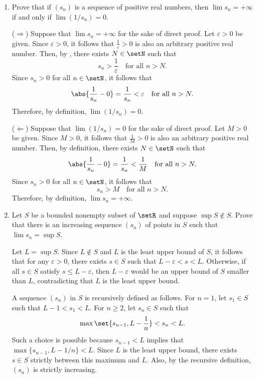 \begin{enumerate}
  \newpage

  \item Prove that if \((s_n)\) is a sequence of positive real numbers, 
  then \(\lim s_n = +\infty\) if and only if \(\lim (1 / s_n) = 0\).
  \begin{subprove}
    (\(\Rightarrow\)) Suppose that \(\lim s_n = +\infty\) for the sake of direct proof.
    Let \(\varepsilon > 0\) be given. Since \(\varepsilon > 0\), it follows that \(\frac{1}{\varepsilon} > 0\) 
    is also an arbitrary positive real number.
    Then, by ,
    there exists \(N \in \setN\) such that
    \[
      s_n > \frac{1}{\varepsilon} \quad\text{for all } n > N.
    \]
    Since \(s_n > 0\) for all \(n \in \setN\), it follows that
    \[
      \abs{\frac{1}{s_n} - 0} = \frac{1}{s_n} < \varepsilon \quad\text{for all } n > N.
    \]
    Therefore, by definition, \(\lim (1 / s_n) = 0\).

    (\(\Leftarrow\)) Suppose that \(\lim (1 / s_n) = 0\) for the sake of direct proof.
    Let \(M > 0\) be given. Since \(M > 0\), it follows that \(\frac{1}{M} > 0\) 
    is also an arbitrary positive real number.
    Then, by definition,
    there exists \(N \in \setN\) such that
    \[
      \abs{\frac{1}{s_n} - 0} = \frac{1}{s_n} < \frac{1}{M} \quad\text{for all } n > N.
    \]
    Since \(s_n > 0\) for all \(n \in \setN\), it follows that
    \[
      s_n > M \quad\text{for all } n > N.
    \]
    Therefore, by definition, \(\lim s_n = +\infty\).
  \end{subprove}



  \item Let \(S\) be a bounded nonempty subset of \(\setR\) and 
  suppose \(\sup S \notin S\). Prove that there is an increasing 
  sequence \((s_n)\) of points in \(S\) such that \(\lim s_n = \sup S\).
  \begin{subprove}
    Let \(L = \sup S\). Since \(L \notin S\) and \(L\) is the least upper bound of \(S\),
    it follows that for any \(\varepsilon > 0\), there exists \(s \in S\) such that \(L - \varepsilon < s < L\).
    Otherwise, if all \(s \in S\) satisfy \(s \leq L - \varepsilon\), then \(L - \varepsilon\) would be
    an upper bound of \(S\) smaller than \(L\), contradicting that \(L\) is the least upper bound.

    A sequence \((s_n)\) in \(S\) is recursively defined as follows.
    For \(n = 1\), let \(s_1 \in S\) such that \(L - 1 < s_1 < L\).
    For \(n \geq 2\), let \(s_n \in S\) such that
    \[
      \max\set{s_{n-1}, L - \frac{1}{n}} < s_n < L.
    \]
    Such a choice is possible because \(s_{n-1} < L\) implies that \(\max\{s_{n-1}, L - 1/n\} < L\).
    Since \(L\) is the least upper bound, there exists \(s \in S\) strictly between this maximum and \(L\).
    Also, by the recursive definition, \((s_n)\) is strictly increasing.


\end{subprove}
\end{enumerate}
